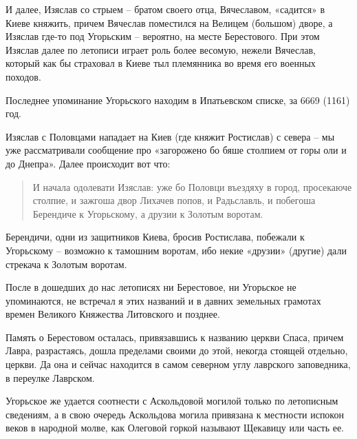 И далее, Изяслав со стрыем – братом своего отца, Вячеславом, «садится» в Киеве княжить, причем Вячеслав поместился на Велицем (большом) дворе, а Изяслав где-то под Угорьским – вероятно, на месте Берестового. При этом Изяслав далее по летописи играет роль более весомую, нежели Вячеслав, который как бы страховал в Киеве тыл племянника во время его военных походов.

Последнее упоминание Угорьского находим в Ипатьевском списке, за 6669 (1161) год. 

Изяслав с Половцами нападает на Киев (где княжит Ростислав) с севера – мы уже рассматривали сообщение про «загорожено бо бяше столпием от горы оли и до Днепра». Далее происходит вот что:

\begin{quotation}
И начала одолевати Изяслав: уже бо Половци въездяху в город, просекаюче столпие, и зажгоша двор Лихачев попов, и Радьславль, и побегоша Берендиче к Угорьскому, а друзии к Золотым воротам.
\end{quotation}

Берендичи, одни из защитников Киева, бросив Ростислава, побежали к Угорьскому – возможно к тамошним воротам, ибо некие «друзии» (другие) дали стрекача к Золотым воротам.

После в дошедших до нас летописях ни Берестовое, ни Угорьское не упоминаются, не встречал я этих названий и в давних земельных грамотах времен Великого Княжества Литовского и позднее.

Память о Берестовом осталась, привязавшись к названию церкви Спаса, причем Лавра, разрастаясь, дошла пределами своими до этой, некогда стоящей отдельно, церкви. Да она и сейчас находится в самом северном углу лаврского заповедника, в переулке Лаврском.

Угорьское же удается соотнести с Аскольдовой могилой только по летописным сведениям, а в свою очередь Аскольдова могила привязана к местности испокон веков в народной молве, как Олеговой горкой называют Щекавицу или часть ее. 

